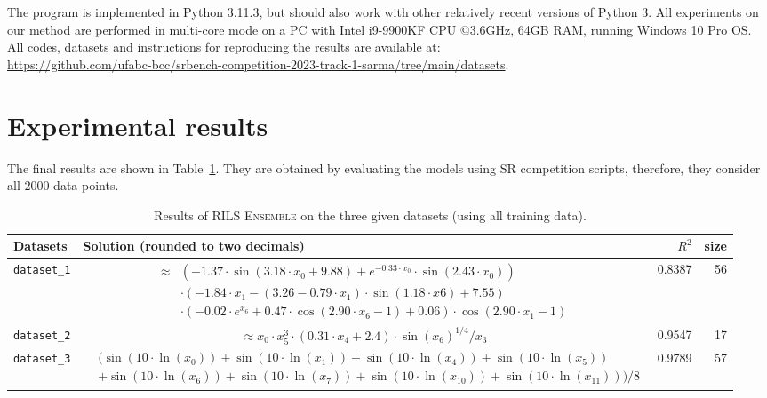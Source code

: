 \documentclass{article}
\begin{document}
The program is implemented in Python 3.11.3, but should also work with other relatively recent versions of Python 3. All experiments on our method are performed in multi-core mode on a PC with Intel i9-9900KF CPU @3.6GHz, 64GB RAM, running Windows 10 Pro OS. All codes, datasets and instructions for reproducing the results are available at: \\ \url{https://github.com/ufabc-bcc/srbench-competition-2023-track-1-sarma/tree/main/datasets}.

\section{Experimental results}

The final results are shown in Table~\ref{tab:results}. They are obtained by evaluating the models using SR competition scripts, therefore, they consider all 2000 data points.

\begin{table}[ht]
 \renewcommand*{\arraystretch}{1.4}
    \footnotesize
    \caption{Results of \textsc{RILS Ensemble} on the three given datasets (using all training data).}
    \centering
    \begin{tabular}{l |lrr} \hline
    Datasets & Solution (rounded to two decimals) & $R^2$   &  size  \\ \hline \hline
      \texttt{dataset\_1}  &
      \parbox{10cm}{
      \begin{equation}
      \nonumber
    \begin{aligned}
      \approx & (-1.37\cdot \sin(3.18\cdot x_0 + 9.88) + e^{-0.33\cdot x_0}\cdot \sin(2.43\cdot x_0)) 
      \\ &\cdot (-1.84\cdot x_1 - (3.26 - 0.79\cdot x_1)\cdot \sin(1.18\cdot x6) + 7.55)
      \\ & \cdot (-0.02\cdot e^{x_6} + 0.47\cdot \cos(2.90\cdot x_6 - 1) + 0.06)\cdot \cos(2.90\cdot x_1 - 1) 
      \end{aligned}
      \end{equation}
      }
      & 0.8387 & 56 \\ \hline
      \texttt{dataset\_2}  & 
      \parbox{10cm}{
      \begin{equation}
      \nonumber
      \approx x_0\cdot x_5^3\cdot(0.31\cdot x_4 + 2.4)\cdot \sin(x_6)^{1/4}/x_3
    \end{equation}
      } & 0.9547 & 17\\ \hline
      \texttt{dataset\_3}  & 
      \parbox{10cm}{
       \begin{equation}
      \nonumber
        \begin{aligned}
      & (\sin(10\cdot \ln(x_0))+ \sin(10\cdot \ln(x_1)) + \sin(10\cdot \ln(x_4)) + \sin(10\cdot \ln(x_5)) \\
      &+ \sin(10\cdot \ln(x_6)) +  \sin(10\cdot \ln(x_7)) + \sin(10\cdot \ln(x_{10})) + \sin(10\cdot \ln(x_{11})))/8
      \end{aligned}
      \end{equation}}
       & 0.9789 & 57\\ \hline
    \end{tabular}
    \label{tab:results}
\end{table}
\end{document}

